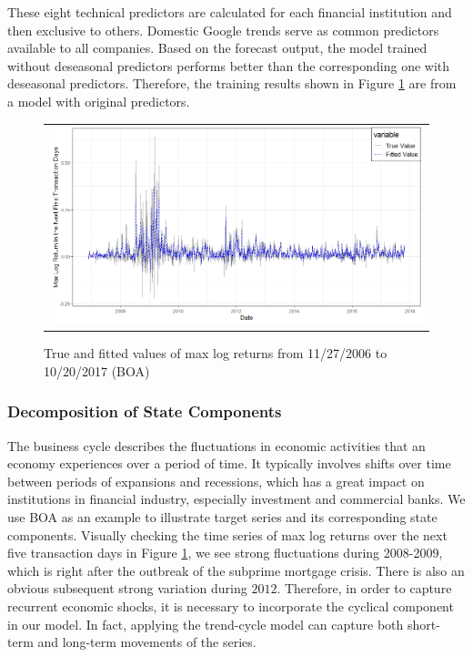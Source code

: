 \documentclass[twoside,11pt]{article}
\begin{document}
These eight technical predictors are calculated for each financial institution and then exclusive to others. Domestic Google trends serve as common predictors available to all companies. Based on the forecast output, the model trained without deseasonal predictors performs better than the corresponding one with deseasonal predictors. Therefore, the training results shown in Figure \ref{fig:return1} are from a model with original predictors.

\begin{figure}[h]
	\centering
	\begin{tabular}{c}
		\includegraphics[width=1\linewidth]{boareturn.png}
	\end{tabular}
	\caption{True and fitted values of max log returns from 11/27/2006 to 10/20/2017 (BOA)}
	\label{fig:return1}
\end{figure}


\subsubsection{Decomposition of State Components}
The business cycle describes the fluctuations in economic activities that an economy experiences over a period of time. It typically involves shifts over time between periods of expansions and recessions, which has a great impact on institutions in financial industry, especially investment and commercial banks. We use BOA as an example to illustrate target series and its corresponding state components. Visually checking the time series of max log returns over the next five transaction days in Figure \ref{fig:return1}, we see strong fluctuations during 2008-2009, which is right after the outbreak of the subprime mortgage crisis. There is also an obvious subsequent strong variation during $2012$. Therefore, in order to capture recurrent economic shocks, it is necessary to incorporate the cyclical component in our model. In fact, applying the trend-cycle model can capture both short-term and long-term movements of the series.
\end{document}
